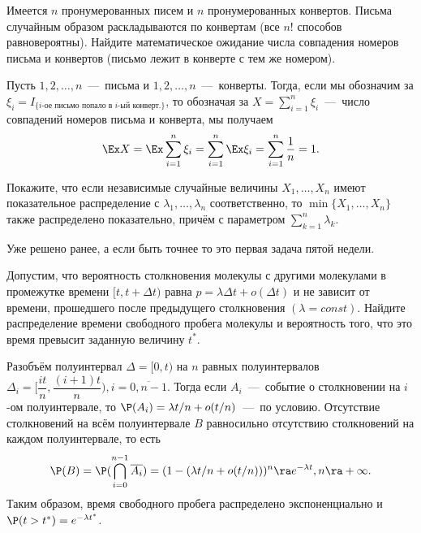 \begin{problem}[75]
    Имеется $n$ пронумерованных писем и $n$ пронумерованных конвертов.
    Письма случайным образом раскладываются по конвертам (все $n!$ способов равновероятны).
    Найдите математическое ожидание числа совпадения номеров письма и конвертов (письмо лежит в конверте с тем же номером).
\end{problem}
\begin{solution}
    Пусть $1, 2, \ldots, n$~---~письма и $1, 2, \ldots, n$~---~конверты.
    Тогда, если мы обозначим за $\xi_i = I_{\{i\text{-ое письмо попало в }i\text{-ый конверт.}\}}$, то обозначая за $X = \sum\limits_{i = 1}^n \xi_i$~---~число совпадений номеров письма и конверта, мы получаем
    \[
        \Ex X = \Ex \sum\limits_{ i = 1}^n \xi_i = \sum\limits_{i = 1}^n \Ex \xi_i = \sum\limits_{i = 1}^n \dfrac{1}{n} = 1.
    \]
\end{solution}
\begin{problem}[80]
    Покажите, что если независимые случайные величины $X_1, \ldots, X_n$ имеют показательное распределение с $\lambda_1, \ldots, \lambda_n$ соответственно, то $\min\{X_1, \ldots, X_n\}$ также распределено показательно, причём с параметром $\sum\limits_{k = 1}^n \lambda_k$.
\end{problem}
\begin{solution}
    Уже решено ранее, а если быть точнее то это первая задача пятой недели.
\end{solution}
\begin{problem}[82]
    Допустим, что вероятность столкновения молекулы с другими молекулами в промежутке времени $[t, t + \Delta t)$ равна $p = \lambda \Delta t + o(\Delta t)$ и не зависит от времени, прошедшего после предыдущего столкновения $(\lambda = const)$.
    Найдите распределение времени свободного пробега молекулы и вероятность того, что это время превысит заданную величину $t^*$.
\end{problem}
\begin{solution}
    Разобъём полуинтервал $\Delta = [0, t)$ на $n$ равных полуинтервалов $\Delta_i = [\dfrac{it}{n}, \dfrac{(i + 1)t}{n}), i = \overline{0, n - 1}$.
    Тогда если $A_i$~---~событие о столкновении на $i$-ом полуинтервале, то $\P(A_i) = \lambda t/n + o(t/n)$~---~по условию.
    Отсутствие столкновений на всём полуинтервале $B$ равносильно отсутствию столкновений на каждом полуинтервале, то есть
    \[
        \P(B) = \P(\bigcap\limits_{i = 0}^{n - 1}\overline{A_i}) = (1 - (\lambda t/n + o(t/n)))^n \ra e^{-\lambda t}, n \ra +\infty.
    \]
    Таким образом, время свободного пробега распределено экспоненциально и $\P(t > t^*) = e^{-\lambda t^*}$.
\end{solution}
